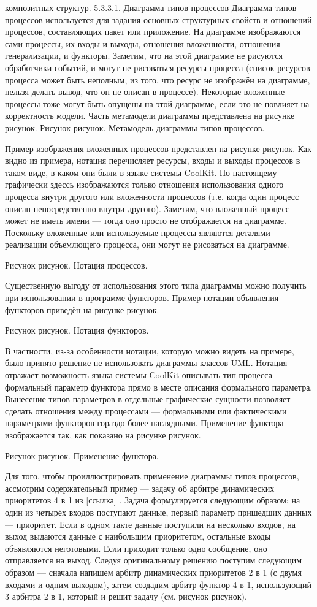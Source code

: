 композитных структур.
5.3.3.1. Диаграмма типов процессов
Диаграмма типов процессов используется для задания основных структурных свойств и отношений процессов, составляющих пакет или приложение. На диаграмме изображаются сами процессы, их входы и выходы, отношения вложенности, отношения генерализации, и функторы. Заметим, что на этой диаграмме не рисуются обработчики событий, и могут не рисоваться ресурсы процесса (список ресурсов процесса может быть неполным, из того, что ресурс не изображён на диаграмме, нельзя делать вывод, что он не описан в процессе). Некоторые вложенные процессы тоже могут быть опущены на этой диаграмме, если это не повлияет на корректность модели. Часть метамодели диаграммы представлена на рисунке рисунок.
Рисунок рисунок. Метамодель диаграммы типов процессов.

Пример изображения вложенных процессов представлен на рисунке рисунок. Как видно из примера, нотация перечисляет ресурсы, входы и выходы процессов в таком виде, в каком они были в языке системы CoolKit. По-настоящему графически здессь изображаются только отношения использования одного процесса внутри другого или вложенности процессов (т.е. когда один процесс описан непосредственно внутри другого). Заметим, что вложенный процесс может не иметь имени --- тогда оно просто не отображается на диаграмме. Поскольку вложенные или используемые процессы являются деталями реализации объемлющего процесса, они могут не рисоваться на диаграмме. 

Рисунок рисунок. Нотация процессов.

Существенную выгоду от использования этого типа диаграммы можно получить при использовании в программе функторов. Пример нотации объявления функторов приведён на рисунке рисунок. 

Рисунок рисунок. Нотация функторов.

В частности, из-за особенности нотации, которую можно видеть на примере, было принято решение не использовать диаграммы классов UML. Нотация отражает возможность языка системы CoolKit описывать тип процесса - формальный параметр функтора прямо в месте описания формального параметра. Вынесение типов параметров в отдельные графические сущности позволяет сделать отношения между процессами --- формальными или фактическими параметрами функторов гораздо более наглядными. Применение функтора изображается так, как показано на рисунке рисунок.

Рисунок рисунок. Применение функтора.


Для того, чтобы проиллюстрировать применение диаграммы типов процессов, ассмотрим содержательный пример --- задачу об арбитре динамических приоритетов 4 в 1 из [ссылка] . Задача формулируется следующим образом: на один из четырёх входов поступают данные, первый параметр пришедших данных --- приоритет. Если в одном такте данные поступили на несколько входов, на выход выдаются данные с наибольшим приоритетом, остальные входы объявляются неготовыми. Если приходит только одно сообщение, оно отправляется на выход.
Следуя оригинальному решению поступим следующим образом --- сначала напишем арбитр динамических приоритетов 2 в 1 (с двумя входами и одним выходом), затем создадим арбитр-функтор 4 в 1, использующий 3 арбитра 2 в 1, который и решит задачу (см. рисунок рисунок). 

